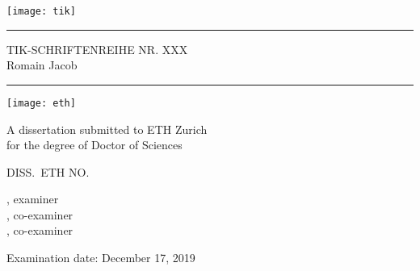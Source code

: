 
\thispagestyle{empty}
\noindent\texttt{[image: tik]}
\medskip
\hrule
\begin{flushright}
\vspace{0.5cm}
TIK-SCHRIFTENREIHE NR. XXX
\\ \vspace{1cm}
\large Romain Jacob \\ \vspace{1cm}
\end{flushright}
\begin{flushright}
\Large\bfseries
\titlestring
\end{flushright}
\vspace{\fill}
\hrule
\bigskip
\texttt{[image: eth]}


\clearpage
\thispagestyle{empty}


\noindent
A dissertation submitted to ETH Zurich\\
for the degree of Doctor of Sciences

\noindent DISS.\ ETH NO.\ \dissnumstring

\noindent \examinerstring, examiner\\
\coexaminerstringA, co-examiner\\
\coexaminerstringB, co-examiner

\noindent Examination date: December 17, 2019\\
\vfill
\noindent
